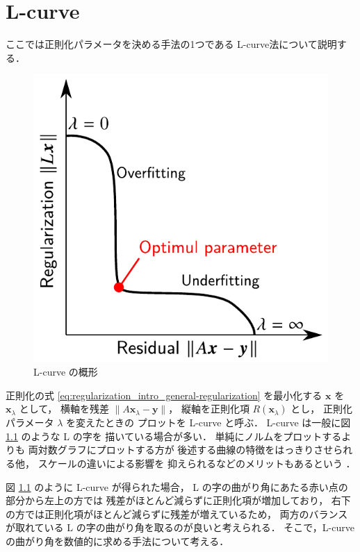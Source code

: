 %

\chapter{L-curve}

ここでは正則化パラメータを決める手法の1つである
L-curve法について説明する．

\begin{figure}[tp]\centering
    \includegraphics{./regularization/L-curve.pdf}
    \caption{L-curve の概形}
    \label{fig:regularization_l-curve_l-curve}
\end{figure}

正則化の式 \eqref{eq:regularization_intro_general-regularization} を最小化する
$\bm{x}$ を $\bm{x}_\lambda$ として，
横軸を残差 $\|A\bm{x}_\lambda-\bm{y}\|$，
縦軸を正則化項 $R(\bm{x}_\lambda)$ とし，
正則化パラメータ $\lambda$ を変えたときの
プロットを L-curve と呼ぶ．
L-curve は一般に図 \ref{fig:regularization_l-curve_l-curve} のような L の字を
描いている場合が多い．
単純にノルムをプロットするよりも
両対数グラフにプロットする方が
後述する曲線の特徴をはっきりさせられる他，
スケールの違いによる影響を
抑えられるなどのメリットもあるという
\cite{Hansen1998}．

図 \ref{fig:regularization_l-curve_l-curve} のように L-curve が得られた場合，
L の字の曲がり角にあたる赤い点の部分から左上の方では
残差がほとんど減らずに正則化項が増加しており，
右下の方では正則化項がほとんど減らずに残差が増えているため，
両方のバランスが取れている L の字の曲がり角を取るのが良いと考えられる．
そこで，L-curve の曲がり角を数値的に求める手法について考える．

